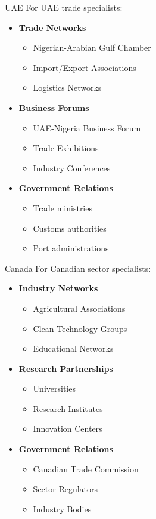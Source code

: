\begin{regionalbox}{UAE}
For UAE trade specialists:

\begin{itemize}
    \item \textbf{Trade Networks}
    \begin{itemize}
        \item Nigerian-Arabian Gulf Chamber
        \item Import/Export Associations
        \item Logistics Networks
    \end{itemize}

    \item \textbf{Business Forums}
    \begin{itemize}
        \item UAE-Nigeria Business Forum
        \item Trade Exhibitions
        \item Industry Conferences
    \end{itemize}

    \item \textbf{Government Relations}
    \begin{itemize}
        \item Trade ministries
        \item Customs authorities
        \item Port administrations
    \end{itemize}
\end{itemize}
\end{regionalbox}

\begin{regionalbox}{Canada}
For Canadian sector specialists:

\begin{itemize}
    \item \textbf{Industry Networks}
    \begin{itemize}
        \item Agricultural Associations
        \item Clean Technology Groups
        \item Educational Networks
    \end{itemize}

    \item \textbf{Research Partnerships}
    \begin{itemize}
        \item Universities
        \item Research Institutes
        \item Innovation Centers
    \end{itemize}

    \item \textbf{Government Relations}
    \begin{itemize}
        \item Canadian Trade Commission
        \item Sector Regulators
        \item Industry Bodies
    \end{itemize}
\end{itemize}
\end{regionalbox}

